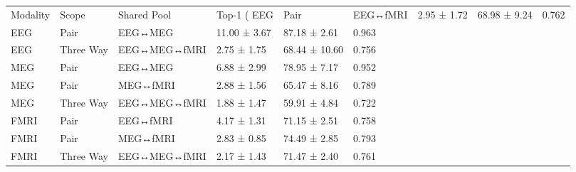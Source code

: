 \begin{tabular}{llllll}
\toprule
Modality & Scope & Shared Pool & Top-1 (%
\midrule
EEG & Pair & EEG↔fMRI & 2.95 ± 1.72 & 68.98 ± 9.24 & 0.762 \\
EEG & Pair & EEG↔MEG & 11.00 ± 3.67 & 87.18 ± 2.61 & 0.963 \\
EEG & Three Way & EEG↔MEG↔fMRI & 2.75 ± 1.75 & 68.44 ± 10.60 & 0.756 \\
MEG & Pair & EEG↔MEG & 6.88 ± 2.99 & 78.95 ± 7.17 & 0.952 \\
MEG & Pair & MEG↔fMRI & 2.88 ± 1.56 & 65.47 ± 8.16 & 0.789 \\
MEG & Three Way & EEG↔MEG↔fMRI & 1.88 ± 1.47 & 59.91 ± 4.84 & 0.722 \\
FMRI & Pair & EEG↔fMRI & 4.17 ± 1.31 & 71.15 ± 2.51 & 0.758 \\
FMRI & Pair & MEG↔fMRI & 2.83 ± 0.85 & 74.49 ± 2.85 & 0.793 \\
FMRI & Three Way & EEG↔MEG↔fMRI & 2.17 ± 1.43 & 71.47 ± 2.40 & 0.761 \\
\bottomrule
\end{tabular}
